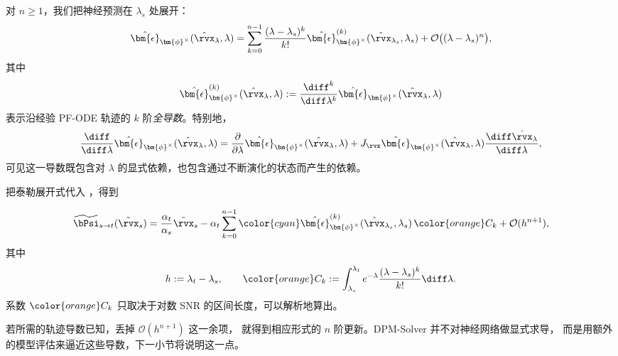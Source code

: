 对 $n\geq1$，我们把神经预测在 $\lambda_s$ 处展开：
\begin{equation*}
\hat{\bm{\epsilon}}_{\bm{\phi}^\times}
(\hat\rvx_\lambda,\lambda)
=
\sum_{k=0}^{n-1}
\frac{(\lambda-\lambda_s)^k}{k!}
\hat{\bm{\epsilon}}_{\bm{\phi}^\times}^{(k)}
(\hat\rvx_{\lambda_s},\lambda_s)
+
\mathcal O\bigl((\lambda-\lambda_s)^n\bigr),
\end{equation*}
其中
\[
\hat{\bm{\epsilon}}_{\bm{\phi}^\times}^{(k)}
(\hat\rvx_\lambda,\lambda)
:=
\frac{\diff^k}{\diff\lambda^k}
\hat{\bm{\epsilon}}_{\bm{\phi}^\times}
(\hat\rvx_\lambda,\lambda)
\]
表示沿经验 PF-ODE 轨迹的 $k$ 阶\emph{全导数}。特别地，
\[
\frac{\diff}{\diff\lambda}
\hat{\bm{\epsilon}}_{\bm{\phi}^\times}
(\hat\rvx_\lambda,\lambda)
=
\frac{\partial}{\partial\lambda}
\hat{\bm{\epsilon}}_{\bm{\phi}^\times}
(\hat\rvx_\lambda,\lambda)
+
J_{\rvx}
\hat{\bm{\epsilon}}_{\bm{\phi}^\times}
(\hat\rvx_\lambda,\lambda)
\frac{\diff\hat\rvx_\lambda}{\diff\lambda},
\]
可见这一导数既包含对 $\lambda$ 的显式依赖，也包含通过不断演化的状态而产生的依赖。

把泰勒展开式代入
，得到
\begin{mdframed}
\begin{equation}
\label{eq:k-th-expansion}
\widetilde\bPsi_{s\to t}(\tilde\rvx_s)
=
\frac{\alpha_t}{\alpha_s}\tilde\rvx_s
-
\alpha_t
\sum_{k=0}^{n-1}
{\color{cyan}
\hat{\bm{\epsilon}}_{\bm{\phi}^\times}^{(k)}
(\hat\rvx_{\lambda_s},\lambda_s)}
\,{\color{orange}C_k}
+
\mathcal O(h^{n+1}),
\end{equation}
其中
\[
h:=\lambda_t-\lambda_s,
\qquad
{\color{orange}C_k}
:=
\int_{\lambda_s}^{\lambda_t}
e^{-\lambda}
\frac{(\lambda-\lambda_s)^k}{k!}
\diff\lambda.
\]
系数 ${\color{orange}C_k}$ 只取决于对数 SNR 的区间长度，可以解析地算出。
\end{mdframed}

若所需的轨迹导数已知，丢掉 $\mathcal O(h^{n+1})$ 这一余项，
就得到相应形式的 $n$ 阶更新。DPM-Solver 并不对神经网络做显式求导，
而是用额外的模型评估来逼近这些导数，下一小节将说明这一点。


